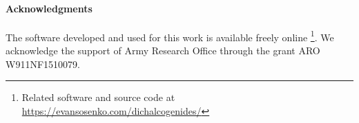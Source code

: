 \paragraph{Acknowledgments}

The software developed and used for this work
is available freely online
\footnote{%
  Related software and source code at \\
  \url{https://evansosenko.com/dichalcogenides/}
}.
We acknowledge the support of Army Research Office through the grant
ARO W911NF1510079.
